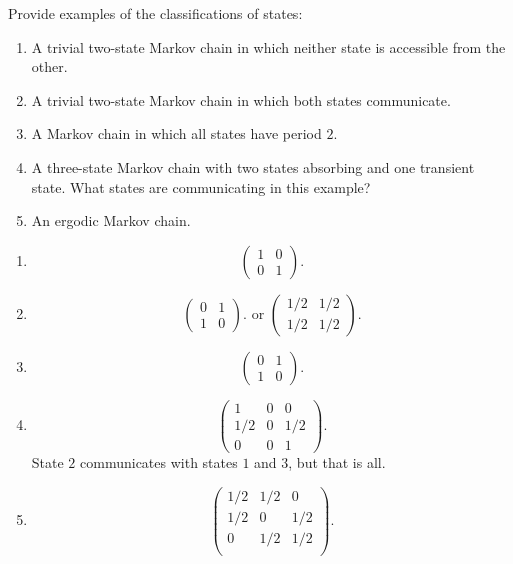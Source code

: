 \documentclass[12pt]{article}
\begin{document}
\begin{exercise}
    Provide examples of the classifications of states:
    \begin{enumerate}[label=(\alph*)]
    \item
        A trivial two-state Markov chain in which neither state is
        accessible from the other.
    \item
        A trivial two-state Markov chain in which both states
        communicate.
    \item
        A Markov chain in which all states have period \( 2 \).
    \item
        A three-state Markov chain with two states absorbing and one
        transient state.  What states are communicating in this example?
    \item
        An ergodic Markov chain.
\end{enumerate}
\end{exercise}
\begin{solution}
    \begin{enumerate}[label=(\alph*)]
    \item
        \[
            \begin{pmatrix}
                1 & 0 \\
                0 & 1
            \end{pmatrix}
            .
        \]
    \item
        \[
            \begin{pmatrix}
                0 & 1 \\
                1 & 0
            \end{pmatrix}
            . \text{ or }
            \begin{pmatrix}
                1/2 & 1/2 \\
                1/2 & 1/2
            \end{pmatrix}
            .
        \]
    \item
        \[
            \begin{pmatrix}
                0 & 1 \\
                1 & 0
            \end{pmatrix}
            .
        \]
    \item
        \[
            \begin{pmatrix}
                1 & 0 & 0 \\
                1/2 & 0 & 1/2 \\
                0 &0 & 1
            \end{pmatrix}
            .
        \] State \( 2 \) communicates with states \( 1 \) and \( 3 \),
        but that is all.
    \item
        \[
            \begin{pmatrix}
                1/2 & 1/2 & 0 \\
                1/2 & 0 & 1/2 \\
                0 & 1/2 & 1/2 \\
            \end{pmatrix}
            .
        \]
\end{enumerate}
\end{solution}
\end{document}
